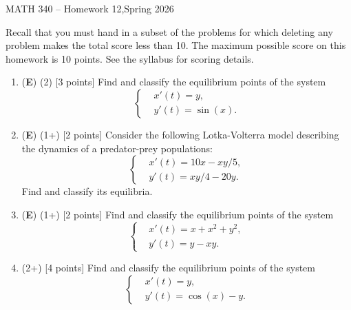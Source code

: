 \documentclass[12pt]{article}
\begin{document}
\begin{center}
   {\Large MATH 340 -- Homework 12,\quad Spring 2026}
\end{center}

Recall that you must hand in a subset of the problems for which deleting any problem makes the total score less than 10. The maximum possible score on this homework is 10 points. See the syllabus for scoring details.

\begin{enumerate}
   \item (\textbf{E}) (2) [3 points] Find and classify the equilibrium points of the system
         \[
            \left\lbrace
            \begin{aligned}
                & x'(t)=y,       \\
                & y'(t)=\sin(x).
            \end{aligned}
            \right.
         \]

   \item (\textbf{E}) (1+) [2 points] Consider the following Lotka-Volterra model describing the dynamics of a predator-prey populations:
         \[
            \left\lbrace
            \begin{aligned}
                & x'(t)=10x-xy/5, \\
                & y'(t)=xy/4-20y.
            \end{aligned}
            \right.
         \]
         Find and classify its equilibria.

   \item (\textbf{E}) (1+) [2 points] Find and classify the equilibrium points of the system
         \[
            \left\lbrace
            \begin{aligned}
                & x'(t)=x+x^2+y^2, \\
                & y'(t)=y-xy.
            \end{aligned}
            \right.
         \]

   \item (2+) [4 points] Find and classify the equilibrium points of the system
         \[
            \left\lbrace
            \begin{aligned}
                & x'(t)=y,           \\
                & y'(t)=\cos(x) - y.
            \end{aligned}
            \right.
         \]


\end{enumerate}
\end{document}
